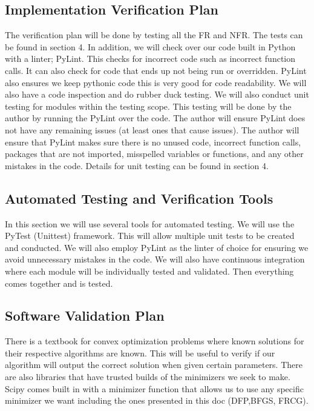 \documentclass[12pt, titlepage]{article}
\begin{document}
\subsection{Implementation Verification Plan}

The verification plan will be done by testing all the FR and
NFR. The tests can be found in section 4. In addition, we will check over our code built
in Python with a linter; PyLint. This checks for incorrect code such as incorrect function calls. It can also check for code that ends up not being run or overridden. PyLint also ensures we keep pythonic code this is very good for code readability. We will also have a code inspection and do rubber duck
testing. We will also conduct unit testing for modules 
within the testing scope.  This testing will be done by the author by running the PyLint over the code. The author will ensure PyLint does not have any remaining issues (at least ones that cause issues). The author will ensure that PyLint makes sure there is no unused code, incorrect function calls, packages that are not imported, misspelled variables or functions, and any other mistakes in the code. Details for unit testing can be found in section 4.


\subsection{Automated Testing and Verification Tools}
In this section we will use several tools for automated testing. We will use the PyTest
 (Unittest) framework. This will allow multiple unit tests to be created and conducted.
 We will also employ PyLint as the linter of choice for ensuring we avoid unnecessary
 mistakes in the code. We will also have continuous integration where each module will be individually tested and validated. Then everything comes together and is tested.


\subsection{Software Validation Plan}
There is a textbook for convex optimization problems \citep{Boyd2006} where known
solutions for their respective algorithms are known. This will be useful to verify 
if our algorithm will output the correct solution when given certain parameters.
There are also libraries that have trusted builds of the minimizers we seek to make. 
Scipy comes built in with a minimizer function that allows us to use any specific
minimizer we want including the ones presented in this doc (DFP,BFGS, FRCG).
\end{document}
